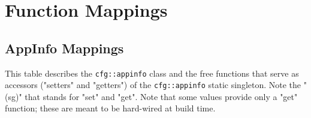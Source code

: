 %
%

\section{Function Mappings}
\label{sec:function_mappings}

\subsection{AppInfo Mappings}
\label{subsec:appinfo_mappings}

   This table describes the \texttt{cfg::appinfo} class and the free functions
   that serve as accessors ("setters" and "getters") of the
   \texttt{cfg::appinfo} static singleton.
   Note the "(sg)" that stands for "set" and "get".
   Note that some values provide only a "get" function;
   these are meant to be hard-wired at build time.

